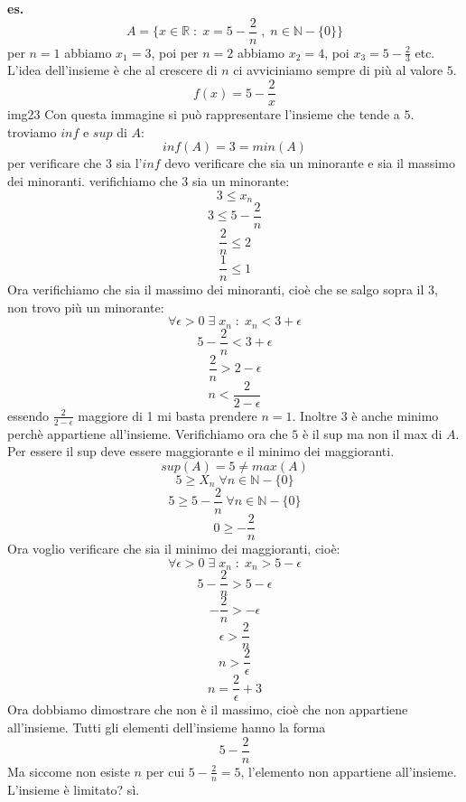 \newline
\textbf{es.} 
\[
    A = \{x \in \mathbb{R} \;:\; x = 5 -\frac{2}{n} \;,\; n \in \mathbb{N}-\{0\}\}
\]
per $n=1$ abbiamo $x_1 =3$, poi per $n=2$ abbiamo $x_2=4$, poi $x_3 = 5-\frac{2}{3}$ etc.
\newline
L'idea dell'insieme è che al crescere di $n$ ci avviciniamo sempre di più al valore $5$.
\newline
\[
    f(x) = 5-\frac{2}{x}
\] 
img23
\newline
Con questa immagine si può rappresentare l'insieme che tende a $5$.
\newline
troviamo $inf$ e $sup$ di $A$:
\[
    inf(A)=3 = min(A)
\]
per verificare che $3$ sia l'$inf$ devo verificare che sia un minorante e sia il massimo dei minoranti.
\newline
verifichiamo che $3$ sia un minorante:
\[
    3 \leq x_n
\]
\[
    3 \leq 5 - \frac{2}{n}    
\]
\[
    \frac{2}{n} \leq 2
\]
\[
    \frac{1}{n} \leq 1
\]
Ora verifichiamo che sia il massimo dei minoranti, cioè che se salgo sopra il $3$, non trovo più un minorante:
\[
    \forall \epsilon > 0 \;\exists\; x_n \;:\; x_n < 3+\epsilon
\]
\[
    5-\frac{2}{n} < 3 +\epsilon    
\]
\[
    \frac{2}{n} > 2 -\epsilon
\]
\[
    n < \frac{2}{2-\epsilon}
\]
essendo $\frac{2}{2-\epsilon}$ maggiore di 1 mi basta prendere $n=1$.
\newline
Inoltre $3$ è anche minimo perchè appartiene all'insieme.
\newline
Verifichiamo ora che $5$ è il sup ma non il max di $A$.
\newline
Per essere il sup deve essere maggiorante e il minimo dei maggioranti.
\[
    sup(A)=5 \neq max(A)
\]
\[
    5 \geq X_n \;  \forall n \in \mathbb{N}-\{0\}
\]
\[
    5\geq 5 - \frac{2}{n} \;  \forall n \in \mathbb{N}-\{0\}
\]
\[
    0\geq -\frac{2}{n}
\]
Ora voglio verificare che sia il minimo dei maggioranti, cioè:
\[
        \forall \epsilon>0 \;\exists\; x_n \;:\; x_n > 5-\epsilon
\]
\[
    5-\frac{2}{n}> 5-\epsilon
\]
\[
    -\frac{2}{n}> -\epsilon
\]
\[
    \epsilon > \frac{2}{n}
\]
\[
    n > \frac{2}{\epsilon}
\]
\[
    n = \frac{2}{\epsilon} +3
\]
Ora dobbiamo dimostrare che non è il massimo, cioè che non appartiene all'insieme.
\newline
Tutti gli elementi dell'insieme hanno la forma 
\[
    5-\frac{2}{n}
\]
Ma siccome non esiste $n$ per cui $5-\frac{2}{n} = 5$, l'elemento non appartiene all'insieme.
\newline
L'insieme è limitato? sì.
\newline
